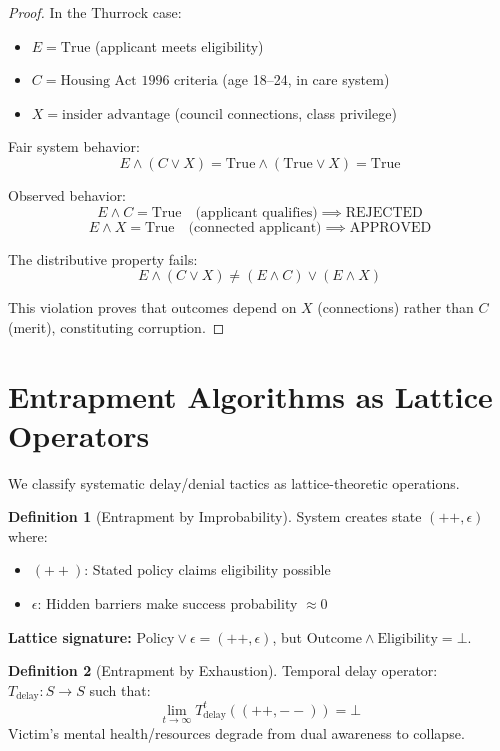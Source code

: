 \documentclass[11pt,a4paper]{article}
\theoremstyle{definition}
\newtheorem{definition}{Definition}
\begin{document}
\begin{proof}
In the Thurrock case:
\begin{itemize}
    \item $E = \text{True}$ (applicant meets eligibility)
    \item $C = \text{Housing Act 1996 criteria}$ (age 18--24, in care system)
    \item $X = \text{insider advantage}$ (council connections, class privilege)
\end{itemize}

Fair system behavior:
\[
E \wedge (C \vee X) = \text{True} \wedge (\text{True} \vee X) = \text{True}
\]

Observed behavior:
\[
E \wedge C = \text{True} \quad \text{(applicant qualifies)} \implies \text{REJECTED}
\]
\[
E \wedge X = \text{True} \quad \text{(connected applicant)} \implies \text{APPROVED}
\]

The distributive property fails:
\[
E \wedge (C \vee X) \neq (E \wedge C) \vee (E \wedge X)
\]

This violation proves that outcomes depend on $X$ (connections) rather than $C$ (merit), constituting corruption.
\end{proof}

\section{Entrapment Algorithms as Lattice Operators}

We classify systematic delay/denial tactics as lattice-theoretic operations.

\begin{definition}[Entrapment by Improbability]
System creates state $(++,\epsilon)$ where:
\begin{itemize}
    \item $(++)$: Stated policy claims eligibility possible
    \item $\epsilon$: Hidden barriers make success probability $\approx 0$
\end{itemize}
\textbf{Lattice signature:} $\text{Policy} \vee \epsilon = (++,\epsilon)$, but $\text{Outcome} \wedge \text{Eligibility} = \bot$.
\end{definition}

\begin{definition}[Entrapment by Exhaustion]
Temporal delay operator: $T_{\text{delay}}: S \to S$ such that:
\[
\lim_{t \to \infty} T_{\text{delay}}^t((++,--)) = \bot
\]
Victim's mental health/resources degrade from dual awareness to collapse.
\end{definition}
\end{document}
